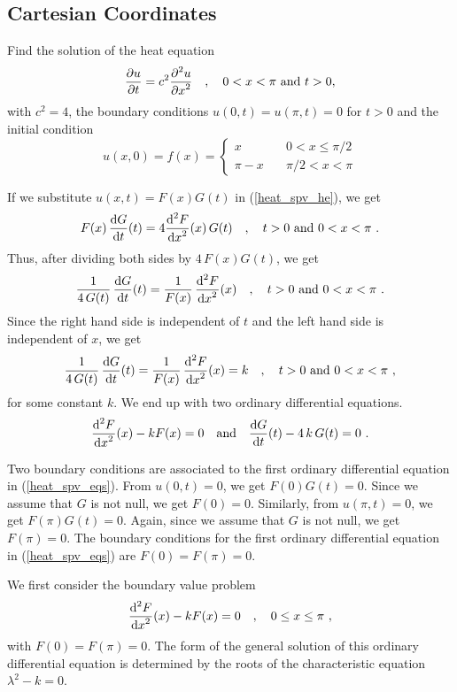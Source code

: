 \subsection{Cartesian Coordinates}

\begin{egg}
Find the solution of the heat equation
\begin{equation} \label{heat_spv_he}
\frac{\partial{u}}{\partial t} = c^2 \frac{\displaystyle \partial^{2}{u}} {\displaystyle \partial x^{2}} \quad ,
\quad 0 < x < \pi \ \text{and} \ t > 0 ,
\end{equation}
with $c^2 = 4$, the boundary conditions
$u(0,t) = u(\pi,t) = 0$ for $t>0$ and the initial condition
\begin{equation} \label{heat_series_init_cond}
u(x,0) = f(x) = \begin{cases}
x & \quad 0 < x \leq \pi/2 \\
\pi - x & \quad \pi/2 < x < \pi
\end{cases}
\end{equation}

If we substitute $u(x,t) = F(x)G(t)$ in (\ref{heat_spv_he}), we get
\[
F(x)\,\frac{\mathrm{d}G}{\mathrm{d}{t}}(t) = 4 \frac{\displaystyle \mathrm{d}^{2}{F}} {\displaystyle \mathrm{d}{x}^{2}}(x)\, G(t)
\quad , \quad t>0 \ \text{and} \ 0<x<\pi \ .
\]
Thus, after dividing both sides by $4\,F(x)G(t)$, we get
\[
\frac{1}{4\,G(t)} \, \frac{\mathrm{d}G}{\mathrm{d}{t}}(t) = \frac{1}{F(x)}\, \frac{\displaystyle \mathrm{d}^{2}{F}} {\displaystyle \mathrm{d}{x}^{2}}(x)
\quad , \quad t>0 \ \text{and} \ 0<x<\pi \ .
\]
Since the right hand side is independent of $t$ and the left hand side
is independent of $x$, we get
\[
\frac{1}{4\,G(t)} \, \frac{\mathrm{d}G}{\mathrm{d}{t}}(t) = \frac{1}{F(x)}\,
\frac{\displaystyle \mathrm{d}^{2}{F}} {\displaystyle \mathrm{d}{x}^{2}}(x) = k \quad , \quad t>0 \ \text{and} \ 0<x<\pi \ ,
\]
for some constant $k$.  We end up with two ordinary differential equations.
\begin{equation} \label{heat_spv_eqs}
\frac{\displaystyle \mathrm{d}^{2}{F}} {\displaystyle \mathrm{d}{x}^{2}}(x) -k F(x) = 0 \quad \text{and}
\quad \frac{\mathrm{d}G}{\mathrm{d}{t}}(t) - 4\,k\,G(t) = 0 \ .
\end{equation}

Two boundary conditions are associated to the first ordinary
differential equation in (\ref{heat_spv_eqs}).   From $u(0,t) = 0$, we
get $F(0)G(t)=0$.  Since we assume that $G$ is not null, we get
$F(0)=0$.  Similarly, from $u(\pi,t) = 0$, we get $F(\pi)G(t)=0$.
Again, since we assume that $G$ is not null, we get $F(\pi)=0$.
The boundary conditions for the first ordinary differential equation
in (\ref{heat_spv_eqs}) are $F(0)=F(\pi)=0$.

We first consider the boundary value problem
\begin{equation} \label{heat_spv_bvp}
\dydxn{F}{x}{2}(x) -k F(x) = 0 \quad , \quad 0 \leq x \leq \pi \ ,
\end{equation}
with $F(0)=F(\pi)=0$.  The form of the general solution of this
ordinary differential equation is determined by the roots of the
characteristic equation $\lambda^2-k=0$.


\end{egg}
